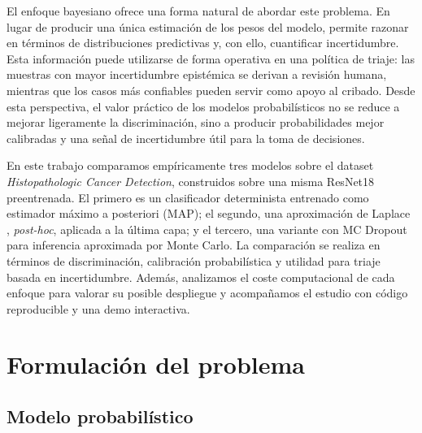 \documentclass{article}
\begin{document}
El enfoque bayesiano ofrece una forma natural de abordar este problema.
En lugar de producir una \'unica estimaci\'on de los pesos del modelo,
permite razonar en t\'erminos de distribuciones predictivas y, con ello,
cuantificar incertidumbre. Esta informaci\'on puede utilizarse de forma
operativa en una pol\'itica de triaje: las muestras con mayor
incertidumbre epist\'emica se derivan a revisi\'on humana, mientras que
los casos m\'as confiables pueden servir como apoyo al cribado. Desde esta
perspectiva, el valor pr\'actico de los modelos probabil\'isticos no se
reduce a mejorar ligeramente la discriminaci\'on, sino a producir
probabilidades mejor calibradas y una se\~nal de incertidumbre \'util para
la toma de decisiones.

En este trabajo comparamos emp\'iricamente tres modelos sobre el dataset
\emph{Histopathologic Cancer Detection}, construidos sobre una
misma ResNet18 preentrenada. El primero es un clasificador determinista
entrenado como estimador m\'aximo a posteriori (MAP); el segundo, una
aproximaci\'on de Laplace \citep{daxberger2021laplace}, \emph{post-hoc}, aplicada a la \'ultima capa; y el
tercero, una variante con MC Dropout \citep{gal2016dropout} para inferencia aproximada por Monte
Carlo. La comparaci\'on se realiza en t\'erminos de discriminaci\'on,
calibraci\'on probabil\'istica y utilidad para triaje basada en
incertidumbre. Adem\'as, analizamos el coste computacional de cada enfoque
para valorar su posible despliegue y acompa\~namos el estudio con c\'odigo
reproducible y una demo interactiva.


\section{Formulaci\'on del problema}
\label{sec:problem}
 
\subsection{Modelo probabil\'istico}
\label{sec:model}
 
\end{document}
